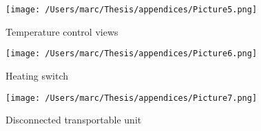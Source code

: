   \begin{figure}[H]
    \texttt{[image: /Users/marc/Thesis/appendices/Picture5.png]}
    \caption{Temperature control views}
  \end{figure}

  \begin{figure}[H]
    \texttt{[image: /Users/marc/Thesis/appendices/Picture6.png]}
    \caption{Heating switch}
  \end{figure}

  \begin{figure}[H]
    \texttt{[image: /Users/marc/Thesis/appendices/Picture7.png]}
    \caption{Disconnected transportable unit}
  \end{figure}

  
  